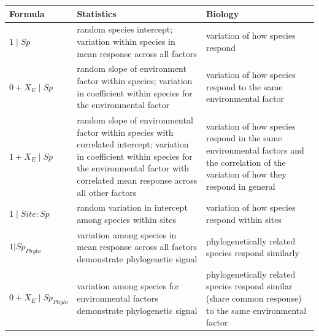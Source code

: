 \begin{tabularx}{\textwidth}{|l|X|X|}
\hline
Formula & Statistics & Biology \\
\hline
$1 \mid Sp$ &
random species intercept; variation within species in mean response across all factors &
variation of how species respond \\
\hline

$0 + X_{E} \mid Sp$ &
random slope of environment factor within species; variation in coefficient within species for the environmental factor &
variation of how species respond to the same environmental factor \\
\hline

$1 + X_{E} \mid Sp$ &
random slope of environmental factor within species with correlated intercept; variation in coefficient within species for the environmental factor with correlated mean response across all other factors &
variation of how species respond in the same environmental factors and the correlation of the variation of how they respond in general \\
\hline

$1 \mid Site:Sp $ &
random variation in intercept among species within sites &
variation of how species respond within sites \\
\hline

$1 | Sp_{Phylo} $ &
variation among species in mean response across all factors demonstrate phylogenetic signal &
phylogenetically related species respond similarly \\
\hline

$0 + X_{E} \mid Sp_{Phylo}$ &
variation among species for environmental factors demonstrate phylogenetic signal &
phylogenetically related species respond similar (share common response) to the same environmental factor \\
\hline
\end{tabularx}
            
                                                                        
